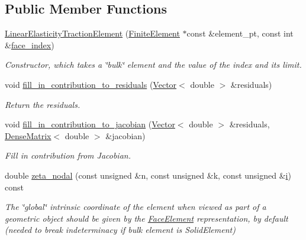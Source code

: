 \subsection*{Public Member Functions}
\begin{DoxyCompactItemize}
\item 
\hyperlink{classoomph_1_1LinearElasticityTractionElement_a77439a3f9cc538b690e43f9198e6b6f1}{Linear\+Elasticity\+Traction\+Element} (\hyperlink{classoomph_1_1FiniteElement}{Finite\+Element} $\ast$const \&element\+\_\+pt, const int \&\hyperlink{classoomph_1_1FaceElement_a478d577ac6db67ecc80f1f02ae3ab170}{face\+\_\+index})
\begin{DoxyCompactList}\small\item\em Constructor, which takes a \char`\"{}bulk\char`\"{} element and the value of the index and its limit. \end{DoxyCompactList}\item 
void \hyperlink{classoomph_1_1LinearElasticityTractionElement_a2f3569331a13c76dcf55021be4d2ea62}{fill\+\_\+in\+\_\+contribution\+\_\+to\+\_\+residuals} (\hyperlink{classoomph_1_1Vector}{Vector}$<$ double $>$ \&residuals)
\begin{DoxyCompactList}\small\item\em Return the residuals. \end{DoxyCompactList}\item 
void \hyperlink{classoomph_1_1LinearElasticityTractionElement_a359bf39aba8f5e99b54f0bc0242409ca}{fill\+\_\+in\+\_\+contribution\+\_\+to\+\_\+jacobian} (\hyperlink{classoomph_1_1Vector}{Vector}$<$ double $>$ \&residuals, \hyperlink{classoomph_1_1DenseMatrix}{Dense\+Matrix}$<$ double $>$ \&jacobian)
\begin{DoxyCompactList}\small\item\em Fill in contribution from Jacobian. \end{DoxyCompactList}\item 
double \hyperlink{classoomph_1_1LinearElasticityTractionElement_a1e9b037926aad0682fd195bb5a9d4f55}{zeta\+\_\+nodal} (const unsigned \&n, const unsigned \&k, const unsigned \&\hyperlink{cfortran_8h_adb50e893b86b3e55e751a42eab3cba82}{i}) const
\begin{DoxyCompactList}\small\item\em The \char`\"{}global\char`\"{} intrinsic coordinate of the element when viewed as part of a geometric object should be given by the \hyperlink{classoomph_1_1FaceElement}{Face\+Element} representation, by default (needed to break indeterminacy if bulk element is Solid\+Element) \end{DoxyCompactList}\item 

\end{DoxyCompactItemize}
